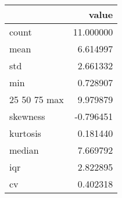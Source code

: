 \begin{tabular}{lr}
\toprule
 & value \\
\midrule
count & 11.000000 \\
mean & 6.614997 \\
std & 2.661332 \\
min & 0.728907 \\
25%
50%
75%
max & 9.979879 \\
skewness & -0.796451 \\
kurtosis & 0.181440 \\
median & 7.669792 \\
iqr & 2.822895 \\
cv & 0.402318 \\
\bottomrule
\end{tabular}
